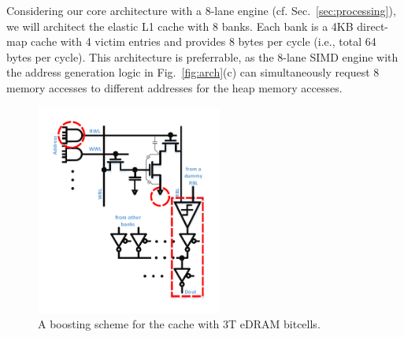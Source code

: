 Considering our core architecture with a 8-lane engine (cf. Sec.~\ref{sec:processing}), 
we will architect the elastic L1 cache with 8 banks. 
Each bank is a 4KB direct-map cache with 4 victim entries and provides 8 bytes per cycle (i.e., total 64 bytes per cycle).
This architecture is preferrable, as the 8-lane SIMD engine with the address generation logic in Fig.~\ref{fig:arch}(c) can simultaneously request 8 memory accesses to different addresses for the heap memory accesses.
\begin{figure}
\center
\includegraphics[width=2.4in, trim=20 20 10 50]{./fig/boosting.pdf}
\caption{A boosting scheme for the cache with 3T eDRAM bitcells.} 
\label{fig:boosting}
\end{figure}

